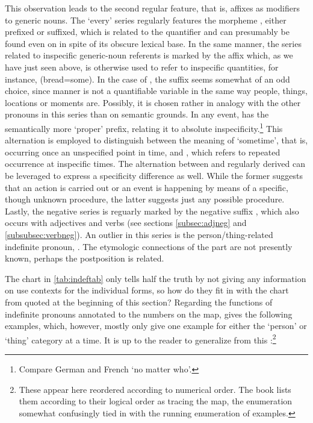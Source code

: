 This observation leads to the second regular feature, that is, affixes as 
modifiers to generic nouns. The `every' series regularly features the 
morpheme , either prefixed or suffixed, which is related to the 
quantifier  and can presumably be found 
even on  in spite of its obscure lexical base. In the same 
manner, the series related to inspecific generic-noun referents is marked by 
the affix  which, as we have just seen above, is otherwise 
used to refer to inspecific quantities, for instance, 
 (bread=some). In the case of 
, the suffix seems somewhat of an 
odd choice, since manner is not a quantifiable variable in the same way people,
things, locations or moments are. Possibly, it is chosen rather in analogy with
the other pronouns in this series than on semantic grounds. In any event,
 has the semantically more `proper'  prefix,
relating it to absolute inspecificity.\footnote{Compare German
 and French  `no matter who'.} This 
alternation is employed to distinguish between the meaning of `sometime', that 
is, occurring once an unspecified point in time, and 
, which refers to repeated occurrence at
inspecific times. The alternation between  and
regularly derived  can be leveraged to express a
specificity difference as well. While the former suggests that an action is
carried out or an event is happening by means of a specific, though unknown
procedure, the latter suggests just any possible procedure. Lastly, the
negative series is reguarly marked by the negative suffix ,
which also occurs with adjectives and verbs (see sections \ref{subsec:adjneg}
and \ref{subsubsec:verbneg}). An outlier in this series is the 
person/thing-related indefinite pronoun, . The etymologic 
connections of the  part are not presently known, perhaps the 
postposition  is related.

The chart in \autoref{tab:indeftab} only tells half the truth by not giving any
information on use contexts for the individual forms, so how do they fit in
with the chart from \citet{haspelmath1997} quoted at the beginning of this
section? Regarding the functions of indefinite pronouns annotated to the
numbers on the map, \citet{haspelmath1997} gives the following examples, which,
however, mostly only give one example for either the `person' or `thing'
category at a time. It is up to the reader to generalize from this 
\citep[2--3]{haspelmath1997}:\footnote{These appear here reordered according 
to numerical order. The book lists them according to their logical order as 
tracing the map, the enumeration somewhat confusingly tied in with the running 
enumeration of examples.}

